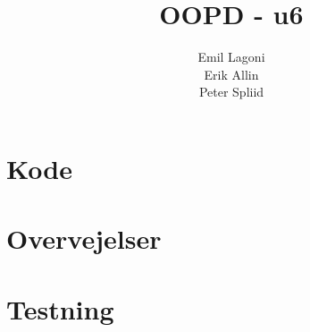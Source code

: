 \documentclass[a4paper,11pt]{article}
\title{\textbf{OOPD - u6}}
\author{Emil Lagoni\\Erik Allin\\Peter Spliid}
\begin{document}
\maketitle

\section*{Kode}

\section*{Overvejelser}

\section*{Testning}
\end{document}

